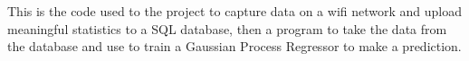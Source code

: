 This is the code used to the project to capture data on a wifi network and upload meaningful statistics to a S\+QL database, then a program to take the data from the database and use to train a Gaussian Process Regressor to make a prediction. 